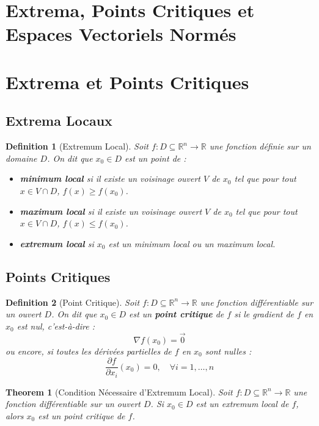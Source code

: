 \documentclass{article}
\newtheorem{theorem}{Theorem}
\newtheorem{definition}{Definition}
\begin{document}
\sloppy

\section*{Extrema, Points Critiques et Espaces Vectoriels Normés}

\section{Extrema et Points Critiques}

\subsection{Extrema Locaux}

\begin{definition}[Extremum Local]
Soit $f: D \subseteq \mathbb{R}^n \rightarrow \mathbb{R}$ une fonction définie sur un domaine $D$. On dit que $x_0 \in D$ est un point de :
\begin{itemize}
    \item \textbf{minimum local} si il existe un voisinage ouvert $V$ de $x_0$ tel que pour tout $x \in V \cap D$, $f(x) \geq f(x_0)$.
    \item \textbf{maximum local} si il existe un voisinage ouvert $V$ de $x_0$ tel que pour tout $x \in V \cap D$, $f(x) \leq f(x_0)$.
    \item \textbf{extremum local} si $x_0$ est un minimum local ou un maximum local.
\end{itemize}
\end{definition}

\subsection{Points Critiques}

\begin{definition}[Point Critique]
Soit $f: D \subseteq \mathbb{R}^n \rightarrow \mathbb{R}$ une fonction différentiable sur un ouvert $D$. On dit que $x_0 \in D$ est un \textbf{point critique} de $f$ si le gradient de $f$ en $x_0$ est nul, c'est-à-dire :
\[ \nabla f(x_0) = \vec{0} \]
ou encore, si toutes les dérivées partielles de $f$ en $x_0$ sont nulles :
\[ \frac{\partial f}{\partial x_i}(x_0) = 0, \quad \forall i = 1, \ldots, n \]
\end{definition}

\begin{theorem}
[Condition Nécessaire d'Extremum Local]
Soit $f: D \subseteq \mathbb{R}^n \rightarrow \mathbb{R}$ une fonction différentiable sur un ouvert $D$. Si $x_0 \in D$ est un extremum local de $f$, alors $x_0$ est un point critique de $f$.
\end{theorem}
\end{document}
